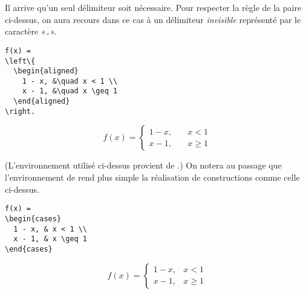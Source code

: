 Il arrive qu'un seul délimiteur soit nécessaire. Pour respecter la
règle de la paire ci-dessus, on aura recours dans ce cas à un
délimiteur \emph{invisible} représenté par le caractère «\verb=.=».
\begin{demo}
  \begin{texample}
\begin{lstlisting}
f(x) =
\left\{
  \begin{aligned}
    1 - x, &\quad x < 1 \\
    x - 1, &\quad x \geq 1
  \end{aligned}
\right.
\end{lstlisting}
    \producing
    \begin{equation*}
      f(x) =
      \left\{
        \begin{aligned}
          1 - x, &\quad x < 1 \\
          x - 1, &\quad x \geq 1
        \end{aligned}
      \right.
    \end{equation*}
  \end{texample}
\end{demo}
(L'environnement  utilisé ci-dessus provient de
.) On notera au passage que l'environnement  de
 rend plus simple la réalisation de constructions comme
celle ci-dessus.
\begin{demo}
  \begin{texample}
\begin{lstlisting}
f(x) =
\begin{cases}
  1 - x, & x < 1 \\
  x - 1, & x \geq 1
\end{cases}
\end{lstlisting}
    \producing
    \begin{equation*}
      f(x) =
      \begin{cases}
        1 - x, & x < 1 \\
        x - 1, & x \geq 1
      \end{cases}
    \end{equation*}
  \end{texample}
\end{demo}

